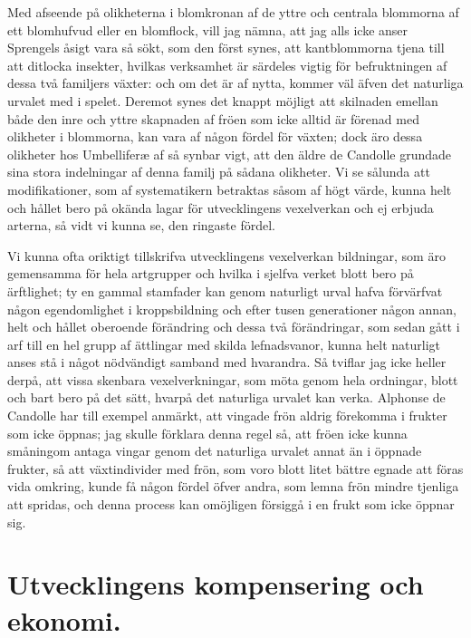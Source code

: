 Med afseende på olikheterna i blomkronan af de yttre och centrala blommorna af ett blomhufvud eller en blomflock, vill jag nämna, att jag alls icke anser Sprengels åsigt vara så sökt, som den först synes, att kantblommorna tjena till att ditlocka insekter, hvilkas verksamhet är särdeles vigtig för befruktningen af dessa två familjers växter: och om det är af nytta, kommer väl äfven det naturliga urvalet med i spelet. Deremot synes det knappt möjligt att skilnaden emellan både den inre och yttre skapnaden af fröen som icke alltid är förenad med olikheter i blommorna, kan vara af någon fördel för växten; dock äro dessa olikheter hos Umbelliferæ af så synbar vigt, att den äldre de Candolle grundade sina stora indelningar af denna familj på sådana olikheter. Vi se sålunda att modifikationer, som af systematikern betraktas såsom af högt värde, kunna helt och hållet bero på okända lagar för utvecklingens vexelverkan och ej erbjuda arterna, så vidt vi kunna se, den ringaste fördel.

Vi kunna ofta oriktigt tillskrifva utvecklingens vexelverkan bildningar, som äro gemensamma för hela artgrupper och hvilka i sjelfva verket blott bero på ärftlighet; ty en gammal stamfader kan genom naturligt urval hafva förvärfvat någon egendomlighet i kroppsbildning och efter tusen generationer någon annan, helt och hållet oberoende förändring och dessa två förändringar, som sedan gått i arf till en hel grupp af ättlingar med skilda lefnadsvanor, kunna helt naturligt anses stå i något nödvändigt samband med hvarandra. Så tviflar jag icke heller derpå, att vissa skenbara vexelverkningar, som möta genom hela ordningar, blott och bart bero på det sätt, hvarpå det naturliga urvalet kan verka. Alphonse de Candolle har till exempel anmärkt, att vingade frön aldrig förekomma i frukter som icke öppnas; jag skulle förklara denna regel så, att fröen icke kunna småningom antaga vingar genom det naturliga urvalet annat än i öppnade frukter, så att växtindivider med frön, som voro blott litet bättre egnade att föras vida omkring, kunde få någon fördel öfver andra, som lemna frön mindre tjenliga att spridas, och denna process kan omöjligen försiggå i en frukt som icke öppnar sig.



\section{Utvecklingens kompensering och ekonomi.}

